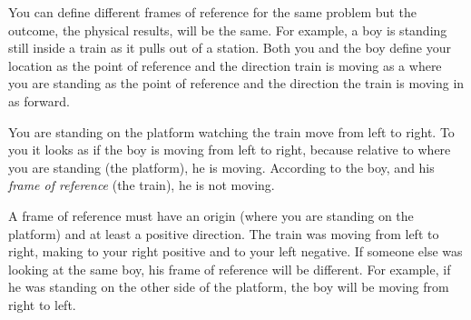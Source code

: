 You can define different frames of reference for the same problem but the outcome, the physical results, will be the same. For example, a boy is standing still inside a train as it pulls out of a station. Both you and the boy define your location as the point of reference and the direction train is moving as a where you are standing as the point of reference and the direction the train is moving in as forward. 

You are standing on the platform watching the train move from left to right. To you it looks as if the boy is moving from left to right, because relative to where you are standing (the platform), he is moving. According to the boy, and his \textsl{frame of reference} (the train), he is not moving.\par 
        \label{m38787*id62666}A frame of reference must have an origin (where you are standing on the platform) and at least a positive direction. The train was moving from left to right, making to your right positive and to your left negative. If someone else was looking at the same boy, his frame of reference will be different. For example, if he was standing on the other side of the platform, the boy will be moving from right to left.\par 
    \setcounter{subfigure}{0}
